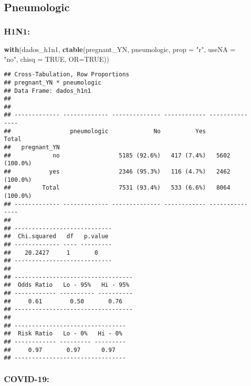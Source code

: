\documentclass[
]{article}
\newenvironment{Shaded}{\begin{snugshade}}{\end{snugshade}}
\newcommand{\DataTypeTok}[1]{\textcolor[rgb]{0.13,0.29,0.53}{#1}}
\newcommand{\KeywordTok}[1]{\textcolor[rgb]{0.13,0.29,0.53}{\textbf{#1}}}
\newcommand{\NormalTok}[1]{#1}
\newcommand{\OtherTok}[1]{\textcolor[rgb]{0.56,0.35,0.01}{#1}}
\newcommand{\StringTok}[1]{\textcolor[rgb]{0.31,0.60,0.02}{#1}}
\begin{document}
\hypertarget{pneumologic}{%
\subsection{Pneumologic}\label{pneumologic}}

\hypertarget{h1n1-6}{%
\subsubsection{H1N1:}\label{h1n1-6}}

\begin{Shaded}
\begin{Highlighting}[]
\KeywordTok{with}\NormalTok{(dados_h1n1, }\KeywordTok{ctable}\NormalTok{(pregnant_YN, pneumologic, }\DataTypeTok{prop =} \StringTok{"r"}\NormalTok{, }\DataTypeTok{useNA =} \StringTok{"no"}\NormalTok{, }\DataTypeTok{chisq =} \OtherTok{TRUE}\NormalTok{, }\DataTypeTok{OR=}\OtherTok{TRUE}\NormalTok{))}
\end{Highlighting}
\end{Shaded}

\begin{verbatim}
## Cross-Tabulation, Row Proportions  
## pregnant_YN * pneumologic  
## Data Frame: dados_h1n1  
## 
## 
## ------------- ------------- -------------- ------------ ---------------
##                 pneumologic             No          Yes           Total
##   pregnant_YN                                                          
##            no                 5185 (92.6%)   417 (7.4%)   5602 (100.0%)
##           yes                 2346 (95.3%)   116 (4.7%)   2462 (100.0%)
##         Total                 7531 (93.4%)   533 (6.6%)   8064 (100.0%)
## ------------- ------------- -------------- ------------ ---------------
## 
## ----------------------------
##  Chi.squared   df   p.value 
## ------------- ---- ---------
##    20.2427     1       0    
## ----------------------------
## 
## ----------------------------------
##  Odds Ratio   Lo - 95%   Hi - 95% 
## ------------ ---------- ----------
##     0.61        0.50       0.76   
## ----------------------------------
## 
## --------------------------------
##  Risk Ratio   Lo - 0%   Hi - 0% 
## ------------ --------- ---------
##     0.97       0.97      0.97   
## --------------------------------
\end{verbatim}

\hypertarget{covid-19-6}{%
\subsubsection{COVID-19:}\label{covid-19-6}}
\end{document}

